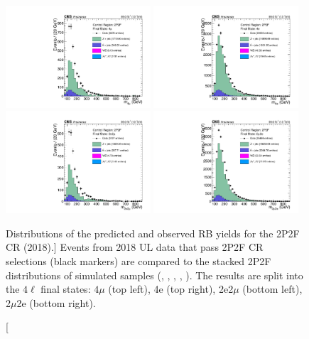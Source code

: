 \begin{figure}[!htbp]
	\begin{center}
		\includegraphics[width=0.48\textwidth]{figures/higgsmassmeas/redbkg/cr/UL2018_CR_2P2F_4mu.pdf}
		\includegraphics[width=0.48\textwidth]{figures/higgsmassmeas/redbkg/cr/UL2018_CR_2P2F_4e.pdf}
		\includegraphics[width=0.48\textwidth]{figures/higgsmassmeas/redbkg/cr/UL2018_CR_2P2F_2e2mu.pdf}
		\includegraphics[width=0.48\textwidth]{figures/higgsmassmeas/redbkg/cr/UL2018_CR_2P2F_2mu2e.pdf}
		\caption
			[Distributions of the predicted and observed RB yields for the 2P2F CR (2018).]
			{
			Events from 2018 UL data that pass 2P2F CR selections (black markers) 
			are compared to the stacked 2P2F distributions of simulated samples
			(\Zplusjets, \ttbarplusjets, \WZ, \ZZ, \Zgammastar).
			The results are split into the $4\ell$ final states:
			$4\mu$ (top left), 4e (top right), 2e2$\mu$ (bottom left), 2$\mu$2e (bottom right).
			}
		\label{cr_plots_2p2f_2018}
		\end{center}
\end{figure}
